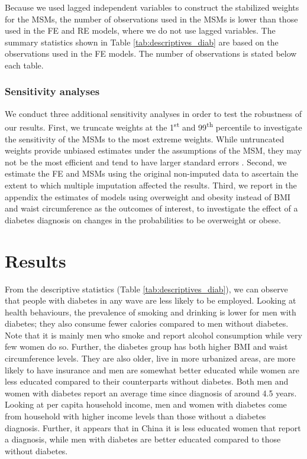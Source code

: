 Because we used lagged independent variables to construct the stabilized weights for the \acp{MSM}, the number of observations used in the \acp{MSM} is lower than those used in the \ac{FE} and \ac{RE} models, where we do not use lagged variables. The summary statistics shown in Table \ref{tab:descriptives_diab} are based on the observations used in the \ac{FE} models. The number of observations is stated below each table.

\subsubsection{Sensitivity analyses}

We conduct three additional sensitivity analyses in order to test the robustness of our results. First, we truncate weights at the 1\textsuperscript{st} and 99\textsuperscript{th} percentile to investigate the sensitivity of the \acp{MSM} to the most extreme weights. While untruncated weights provide unbiased estimates under the assumptions of the \ac{MSM}, they may not be the most efficient and tend to have larger standard errors \parencite{Cole2008}. Second, we estimate the \ac{FE} and \acp{MSM} using the original non-imputed data to ascertain the extent to which multiple imputation affected the results. Third, we report in the appendix the estimates of models using overweight and obesity instead of \ac{BMI} and waist circumference as the outcomes of interest, to investigate the effect of a diabetes diagnosis on changes in the probabilities to be overweight or obese.

\section{\label{sec:Results5}Results}

From the descriptive statistics (Table \ref{tab:descriptives_diab}), we can observe that people with diabetes in any wave are less likely to be employed. Looking at health behaviours, the prevalence of smoking and drinking is lower for men with diabetes; they also consume fewer calories compared to men without diabetes.  Note that it is mainly men who smoke and report alcohol consumption while very few women do so. Further, the diabetes group has both higher \ac{BMI} and waist circumference levels. They are also older, live in more urbanized areas, are more likely to have insurance and men are somewhat better educated while women are less educated compared to their counterparts without diabetes. Both men and women with diabetes report an average time since diagnosis of around 4.5 years. Looking at per capita household income, men and women with diabetes come from household with higher income levels than those without a diabetes diagnosis. Further, it appears that in China it is less educated women that report a diagnosis, while men with diabetes are better educated compared to those without diabetes.

